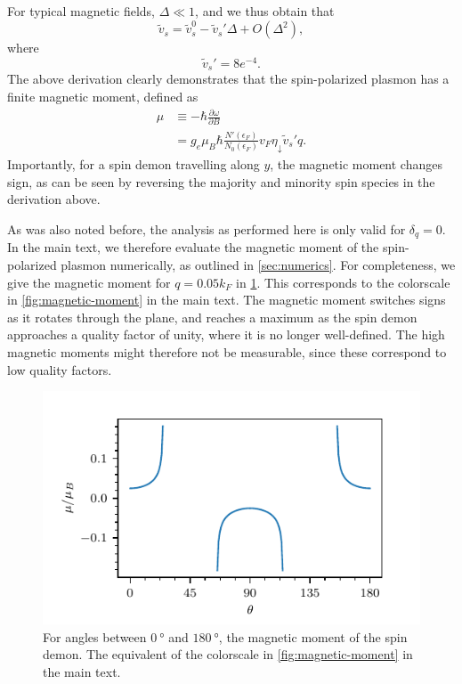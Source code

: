 \documentclass[aps,prb,reprint,twocolumns,superscriptaddress,nofootinbib]{revtex4-2}
\newcommand{\kF}{k_{F}}
\begin{document}
	For typical magnetic fields, $\Delta\ll1$, and we thus obtain that
	\begin{equation}
		\tilde v_s = \tilde v_s^0 -  \tilde v_s' \Delta + O(\Delta^2),
	\end{equation}
	where 
	\begin{equation}
		\tilde v_s' = 8 e^{-4}.
	\end{equation}
	The above derivation clearly demonstrates that the spin-polarized plasmon has a finite magnetic moment, defined as
	\begin{align}
		\mu &\equiv -\hbar \frac{\partial \omega}{\partial B} \label{eq:magnetic-moment}\\
		&=g_e\mu_B\hbar \frac{N'(\epsilon_F)}{N_0(\epsilon_F)} v_F \eta_\downarrow  \tilde v_s' q.
	\end{align}
	Importantly, for a spin demon travelling along $y$, the magnetic moment changes sign, as can be seen by reversing the majority and minority spin species in the derivation above. 
	
	As was also noted before, the analysis as performed here is only valid for $\delta_q=0$.
	In the main text, we therefore evaluate the magnetic moment of the spin-polarized plasmon numerically, as outlined in \cref{sec:numerics}. For completeness, we give the magnetic moment for $q=0.05\kF$ in \cref{fig:magnetic-moment-SM}. This corresponds to the colorscale in \cref{fig:magnetic-moment} in the main text. The magnetic moment switches signs as it rotates through the plane, and reaches a maximum as the spin demon approaches a quality factor of unity, where it is no longer well-defined. The high magnetic moments might therefore not be measurable, since these correspond to low quality factors. 
	
	\begin{figure}
		\includegraphics{non-polar-plot-sign}
		\caption{For angles between $\SI{0}{\degree}$ and $\SI{180}{\degree}$, the magnetic moment of the spin demon. The equivalent of the colorscale in \cref{fig:magnetic-moment} in the main text. \label{fig:magnetic-moment-SM}}
	\end{figure}
\end{document}
